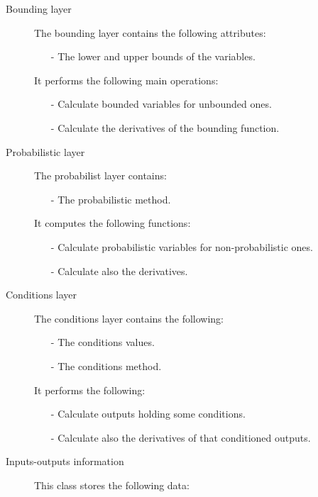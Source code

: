 \begin{description}
\item[Bounding layer] The bounding layer contains the following attributes:

\begin{itemize}
\item[-] The lower and upper bounds of the variables.
\end{itemize}

It performs the following main operations:

\begin{itemize}
\item[-] Calculate bounded variables for unbounded ones.
\item[-] Calculate the derivatives of the bounding function.
\end{itemize}

\item[Probabilistic layer] The probabilist layer contains:

\begin{itemize}
\item[-] The probabilistic method.
\end{itemize}

It computes the following functions:

\begin{itemize}
\item[-] Calculate probabilistic variables for non-probabilistic ones.
\item[-] Calculate also the derivatives.
\end{itemize}

\item[Conditions layer] The conditions layer contains the following:

\begin{itemize}
\item[-] The conditions values.
\item[-] The conditions method.
\end{itemize}

   
It performs the following:

\begin{itemize}
\item[-] Calculate outputs holding some conditions. 
\item[-] Calculate also the derivatives of that conditioned outputs.
\end{itemize}

\item[Inputs-outputs information] This class stores the following data:


\end{description}
